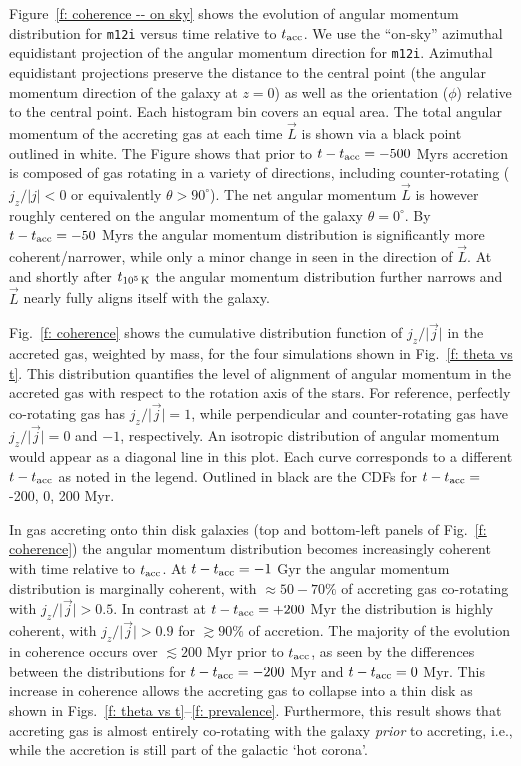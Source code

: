 \documentclass[fleqn,usenatbib]{mnras}
\newcommand{\tcools}{t_{10^5\,{\rm K}}}
\newcommand{\tacc}{t_{\rm acc}}
\begin{document}
Figure~\ref{f: coherence -- on sky} shows the evolution of angular momentum distribution for \texttt{m12i} versus time relative to $\tacc$. 
We use the ``on-sky'' azimuthal equidistant projection of the angular momentum direction for \texttt{m12i}.
Azimuthal equidistant projections preserve the distance to the central point (the angular momentum direction of the galaxy at $z=0$) as well as the orientation ($\phi$) relative to the central point.
Each histogram bin covers an equal area.
The total angular momentum of the accreting gas at each time $\vec L$ is shown via a black point outlined in white.
The Figure shows that prior to $t - \tacc = -500$ Myrs accretion is composed of gas rotating in a variety of directions, including counter-rotating ($j_z/\vert j \vert < 0$ or equivalently $\theta > 90^\circ$).
The net angular momentum $\vec L$ is however roughly centered on the angular momentum of the galaxy $\theta = 0^\circ$.
By $t - \tacc = -50$ Myrs the angular momentum distribution is significantly more coherent/narrower, while only a minor change in seen in the direction of $\vec L$.
At and shortly after $\tcools$ the angular momentum distribution further narrows and $\vec L$ nearly fully aligns itself with the galaxy.

Fig.~\ref{f: coherence} shows the cumulative distribution function of $j_z / \vert \vec j \vert$ in the accreted gas, weighted by mass, for the four simulations shown in Fig.~\ref{f: theta vs t}.
This distribution quantifies the level of alignment of angular momentum in the accreted gas with respect to the rotation axis of the stars.
For reference, perfectly co-rotating gas has $j_z / \vert \vec j \vert = 1$, while perpendicular and counter-rotating gas have $j_z / \vert \vec j \vert = 0$ and $-1$, respectively.
An isotropic distribution of angular momentum would appear as a diagonal line in this plot. 
Each curve corresponds to a different $t - \tacc$ as noted in the legend.
Outlined in black are the CDFs for $t - \tacc =$ -200, 0, 200 Myr.

In gas accreting onto thin disk galaxies (top and bottom-left panels of Fig.~\ref{f: coherence}) the angular momentum distribution becomes increasingly coherent with time relative to $\tacc$.
At $t-\tacc=-1$ Gyr the angular momentum distribution is marginally coherent, with $\approx50-70\%$ of accreting gas co-rotating with $j_z/\vert \vec j \vert > 0.5$.
In contrast at $t-\tacc=+200$ Myr the distribution is highly coherent, with $j_z/\vert \vec j \vert > 0.9$ for $\gtrsim 90\%$ of accretion.
The majority of the evolution in coherence occurs over $\lesssim 200$ Myr prior to $\tacc$, as seen by the differences between the distributions for $t-\tacc=-200$ Myr and $t-\tacc=0$ Myr.
This increase in coherence allows the accreting gas to collapse into a thin disk as shown in Figs.~\ref{f: theta vs t}--\ref{f: prevalence}.
Furthermore, this result shows that accreting gas is almost entirely co-rotating with the galaxy {\em prior} to accreting, i.e., while the accretion is still part of the galactic `hot corona'. 
\end{document}
